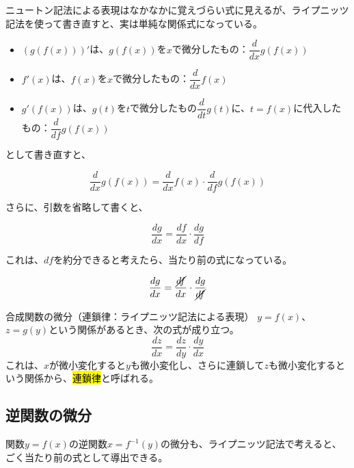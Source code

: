 \documentclass[../math-imaging]{subfiles}
\begin{document}
ニュートン記法による表現はなかなかに覚えづらい式に見えるが、ライプニッツ記法を使って書き直すと、実は単純な関係式になっている。

\begin{itemize}
  \item $\left( g(f(x)) \right)'$は、$g(f(x))$を$x$で微分したもの：$\dfrac{d}{dx} g(f(x))$
  \item $f'(x)$は、$f(x)$を$x$で微分したもの：$\dfrac{d}{dx} f(x)$
  \item $g'(f(x))$は、$g(t)$を$t$で微分したもの$\dfrac{d}{dt} g(t)$に、$t=f(x)$に代入したもの：$\dfrac{d}{df}g(f(x))$
\end{itemize}

として書き直すと、

\begin{equation}
  \dfrac{d}{dx} g(f(x)) = \dfrac{d}{dx}f(x) \cdot \dfrac{d}{df}g(f(x))
\end{equation}

さらに、引数を省略して書くと、

\begin{equation}
  \frac{dg}{dx} = \frac{df}{dx} \cdot \frac{dg}{df}
\end{equation}

これは、$df$を約分できると考えたら、当たり前の式になっている。

\begin{equation}
  \frac{dg}{dx} = \frac{\cancel{df}}{dx} \cdot \frac{dg}{\cancel{df}}
\end{equation}

\begin{theorem}{合成関数の微分（連鎖律：ライプニッツ記法による表現）}
  \newline
  $y=f(x)$、$z=g(y)$という関係があるとき、次の式が成り立つ。
  \LARGE
  \begin{equation}
    \frac{dz}{dx} = \frac{dz}{dy} \cdot \frac{dy}{dx}
  \end{equation}
  \normalsize
  これは、$x$が微小変化すると$y$も微小変化し、さらに連鎖して$z$も微小変化するという関係から、\hl{連鎖律}と呼ばれる。
\end{theorem}

\subsection{逆関数の微分}

関数$y=f(x)$の逆関数$x = f^{-1}(y)$の微分も、ライプニッツ記法で考えると、ごく当たり前の式として導出できる。
\end{document}

